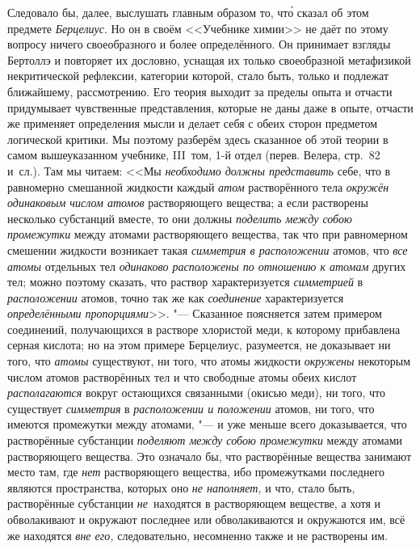 Следовало бы, далее, выслушать главным образом то, чт\'{о} сказал об этом
предмете {\em Берцелиус}. Но он в своём <<Учебнике химии>> не даёт по этому
вопросу ничего своеобразного и более определённого. Он принимает взгляды
Бертоллэ и повторяет их дословно, уснащая их только своеобразной метафизикой
некритической рефлексии, категории которой, стало быть, только и подлежат
ближайшему, рассмотрению. Его теория выходит за пределы опыта и отчасти
придумывает чувственные представления, которые не даны даже в опыте, отчасти же
применяет определения мысли и делает себя с обеих сторон предметом логической
критики. Мы поэтому разберём здесь сказанное об этой теории в самом
вышеуказанном учебнике, III~том, 1-й отдел (перев. Велера, стр.~82 и~сл.). Там
мы читаем: <<Мы {\em необходимо должны представить} себе, что в равномерно
смешанной жидкости каждый {\em атом} растворённого тела
{\em окружён одинаковым числом атомов} растворяющего вещества; а если
растворены несколько субстанций вместе, то они должны {\em поделить между собою
промежутки} между атомами растворяющего вещества, так что при равномерном
смешении жидкости возникает такая {\em симметрия в расположении} атомов, что
{\em все атомы} отдельных тел {\em одинаково расположены по отношению к атомам}
других тел; можно поэтому сказать, что раствор характеризуется {\em симметрией}
в {\em расположении} атомов, точно так же как {\em соединение} характеризуется
{\em определёнными пропорциями}>>. "--- Сказанное поясняется затем примером
соединений, получающихся в растворе хлористой меди, к которому прибавлена
серная кислота; но на этом примере Берцелиус, разумеется, не доказывает ни
того, что {\em атомы} существуют, ни того, что атомы жидкости {\em окружены}
некоторым числом атомов растворённых тел и что свободные атомы обеих кислот
{\em располагаются} вокруг остающихся связанными (окисью меди), ни того, что
существует {\em симметрия} в {\em расположении и положении} атомов, ни того,
что имеются промежутки между атомами, "--- и уже меньше всего доказывается, что
растворённые субстанции {\em поделяют между собою промежутки} между атомами
растворяющего вещества. Это означало бы, что растворённые вещества занимают
место там, где {\em нет} растворяющего вещества, ибо промежутками последнего
являются пространства, которых оно {\em не наполняет,} и что, стало быть,
растворённые субстанции {\em не}~находятся в растворяющем веществе, а хотя и
обволакивают и окружают последнее или обволакиваются и окружаются им, всё же
находятся {\em вне его,} следовательно, несомненно также и не растворены им.
